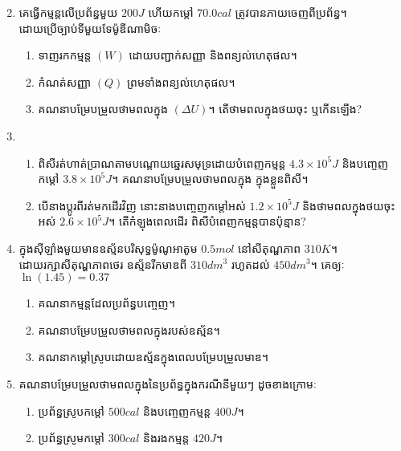 \begin{enumerate}[m]
\begin{multicols}{2}
\begin{figure}[H]
		\end{figure}
	\end{multicols}
	\item គេធ្វើកម្មន្តលើប្រព័ន្ធមួយ $200J$ ហើយកម្តៅ $70.0cal$ ត្រូវបានភាយចេញពីប្រព័ន្ធ។ \\ដោយប្រើច្បាប់ទីមួយទែម៉ូឌីណាមិចៈ
	\begin{enumerate}[k]
		\item ទាញរកកម្មន្ត $\left(W\right)$ ដោយបញ្ជាក់សញ្ញា និងពន្យល់ហេតុផល។
		\item កំណត់សញ្ញា $\left(Q\right)$ ព្រមទាំងពន្យល់ហេតុផល។
		\item គណនាបម្រែបម្រួលថាមពលក្នុង $\left(\Delta U\right)$។ តើថាមពលក្នុងថយចុះ ឬកើនឡើង?
	\end{enumerate}
	\item \begin{enumerate}[k]
		\item ពិសីរត់ហាត់ប្រាណតាមបណ្តោយឆ្នេរសមុទ្រដោយបំពេញកម្មន្ត $4.3\times10^{5}J$ និងបញ្ចេញកម្តៅ $3.8\times10^{5}J$។ គណនាបម្រែបម្រួលថាមពលក្នុង ក្នុងខ្លួនពិសី។
		\item បើនាងប្តូរពីរត់មកដើរវិញ នោះនាងបញ្ចេញកម្តៅអស់ $1.2\times10^{5}J$ និងថាមពលក្នុងថយចុះអស់ $2.6\times10^{5}J$។ តើកំឡុងពេលដើរ ពិសីបំពេញកម្មន្តបានប៉ុន្មាន?
	\end{enumerate}
	\item ក្នុងសុីឡាំងមួយមានឧស្ម័នបរិសុទ្ធម៉ូណូអាតូម $0.5mol$ នៅសីតុណ្ហភាព $310K$។\\ ដោយរក្សាសីតុណ្ហភាពថេរ ឧស្ម័នរីកមាឌពី $310dm^{3}$ រហូតដល់ $450dm^{3}$។ គេឲ្យៈ $\ln\left(1.45\right)=0.37$
	\begin{enumerate}[k,2]
		\item គណនាកម្មន្តដែលប្រព័ន្ធបញ្ចេញ។
		\item គណនាបម្រែបម្រួលថាមពលក្នុងរបស់ឧស្ម័ន។
		\item គណនាកម្តៅស្រូបដោយឧស្ម័នក្នុងពេលបម្រែបម្រួលមាឌ។
	\end{enumerate}
	\item គណនាបម្រែបម្រួលថាមពលក្នុងនៃប្រព័ន្ធក្នុងករណីនីមួយៗ ដូចខាងក្រោមៈ
	\begin{enumerate}[k]
		\item ប្រព័ន្ធស្រូបកម្តៅ $500cal$ និងបញ្ចេញកម្មន្ត $400J$។
		\item ប្រព័ន្ធស្រូមកម្តៅ $300cal$ និងរងកម្មន្ត $420J$។

\end{enumerate}
\end{enumerate}

